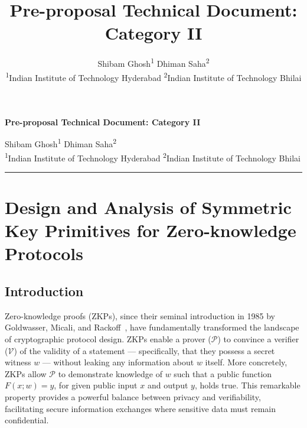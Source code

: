 
\newcommand{\soptitle}{Pre-proposal Technical Document: Category II}


\title{\sffamily\bfseries\Large\textcolor{theme}{\soptitle}}\par
\author{
    Shibam Ghosh\textsuperscript{1} \quad Dhiman Saha\textsuperscript{2} \\[1ex]
    \normalsize \textsuperscript{1}Indian Institute of Technology Hyderabad 
    \normalsize \textsuperscript{2}Indian Institute of Technology Bhilai
}

\date{} %


\begin{center}
\vspace*{-0.8cm}
{\sffamily\bfseries\Large \textcolor{theme}{\soptitle}}\par
\vspace{2pt}
Shibam Ghosh\textsuperscript{1} \quad Dhiman Saha\textsuperscript{2} \\[1ex]
\small \textsuperscript{1}Indian Institute of Technology Hyderabad 
  \small \textsuperscript{2}Indian Institute of Technology Bhilai \\[1ex]
\vspace{8pt}
\hrule
\end{center}

\section{{\bfseries Design and Analysis of Symmetric Key Primitives for Zero-knowledge Protocols}}
\vspace*{-0.3cm}
\subsection{Introduction}
\vspace*{-0.1cm}
Zero-knowledge proofs (ZKPs), since their seminal introduction in 1985 by Goldwasser, Micali, and Rackoff~\cite{DBLP:conf/stoc/GoldwasserMR85}, have fundamentally transformed the landscape of cryptographic protocol design.
ZKPs enable a prover ($\mathcal{P}$) to convince a verifier ($\mathcal{V}$) of the validity of a statement --- specifically, that they possess a secret witness $w$ --- without leaking any information about $w$ itself.
More concretely, ZKPs allow $\mathcal{P}$ to demonstrate knowledge of $w$ such that a public function $F(x; w) = y$, for given public input $x$ and output $y$, holds true.
This remarkable property provides a powerful balance between privacy and verifiability, facilitating secure information exchanges where sensitive data must remain confidential.

